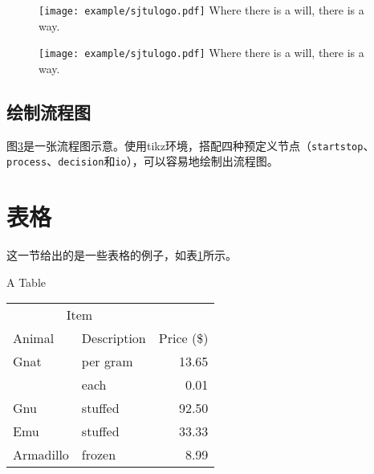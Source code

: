 \begin{figure}[!htp]
 \centering
 \texttt{[image: example/sjtulogo.pdf]}
    {Where there is a will, there is a way.}
 \label{fig:longcaptionbad}
\end{figure}

\begin{figure}[!htbp]
  \centering
  \begin{minipage}[b]{0.6\textwidth}
    \centering
    \texttt{[image: example/sjtulogo.pdf]}
      {Where there is a will, there is a way.}
    \label{fig:longcaptiongood}
  \end{minipage}     
\end{figure}

\subsection{绘制流程图}

图\ref{fig:flow_chart}是一张流程图示意。使用tikz环境，搭配四种预定义节点（\verb+startstop+、\verb+process+、\verb+decision+和\verb+io+），可以容易地绘制出流程图。
\begin{figure}[!htp]
    \centering
    \resizebox{6cm}{!}{}
    \label{fig:flow_chart}
\end{figure}
  
\clearpage

\section{表格}
\label{sec:tab}

这一节给出的是一些表格的例子，如表\ref{tab:firstone}所示。

\begin{table}[!hpb]
  \centering
    {A Table}
  \label{tab:firstone}
  \begin{tabular}{@{}llr@{}} \toprule
    \multicolumn{2}{c}{Item} \\ \cmidrule(r){1-2}
    Animal & Description & Price (\$)\\ \midrule
    Gnat & per gram & 13.65 \\
    & each & 0.01 \\
    Gnu & stuffed & 92.50 \\
    Emu & stuffed & 33.33 \\
    Armadillo & frozen & 8.99 \\ \bottomrule
  \end{tabular}
\end{table}

